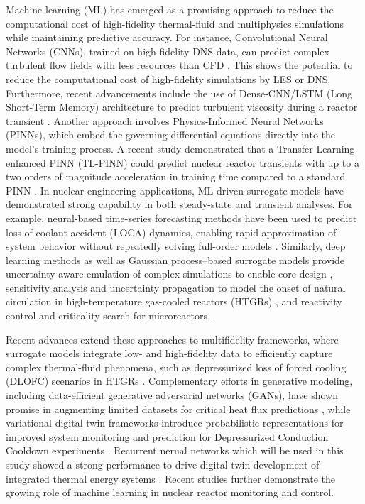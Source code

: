 \documentclass[review]{elsarticle}
\theoremstyle{definition}
\theoremstyle{definition}
\theoremstyle{remark}
\begin{document}
Machine learning (ML) has emerged as a promising approach to reduce the computational cost of high-fidelity thermal-fluid and multiphysics simulations while maintaining predictive accuracy. For instance, {C}onvolutional {N}eural {N}etworks ({CNN}s), trained on high-fidelity {DNS} data, can predict complex turbulent flow fields with less resources than {CFD} \cite{Guo2016, Liu2022111716, Guastoni2021}.  This shows the potential to reduce the computational cost of high-fidelity simulations by {LES} or {DNS}. Furthermore, recent advancements include the use of Dense-{CNN}/{LSTM} ({L}ong {S}hort-{T}erm {M}emory) architecture to predict turbulent viscosity during a reactor transient \cite{Liu2022111716}. Another approach involves {P}hysics-{I}nformed {N}eural {N}etworks ({PINN}s), which embed the governing differential equations directly into the model's training process. A recent study demonstrated that a {T}ransfer {L}earning-enhanced {PINN} ({TL-PINN}) could predict nuclear reactor transients with up to a two orders of magnitude acceleration in training time compared to a standard {PINN} \cite{Konstantinos2023}. In nuclear engineering applications, ML-driven surrogate models have demonstrated strong capability in both steady-state and transient analyses. For example, neural-based time-series forecasting methods have been used to predict loss-of-coolant accident (LOCA) dynamics, enabling rapid approximation of system behavior without repeatedly solving full-order models \cite{radaideh2020neural}. Similarly, deep learning methods \cite{radaideh2019combining,radaideh2020analyzing} as well as Gaussian process–based surrogate models \cite{radaideh2020surrogate} provide uncertainty-aware emulation of complex simulations to enable core design \cite{saleem2020application}, sensitivity analysis and uncertainty propagation to model the onset of natural circulation in high-temperature gas-cooled reactors (HTGRs) \cite{eaheart2025sensitivity}, and reactivity control and criticality search for microreactors \cite{price2022multiobjective,radaideh2026multistep}. 

Recent advances extend these approaches to multifidelity frameworks, where surrogate models integrate low- and high-fidelity data to efficiently capture complex thermal-fluid phenomena, such as depressurized loss of forced cooling (DLOFC) scenarios in HTGRs \cite{eaheart2026multifidelity}. Complementary efforts in generative modeling, including data-efficient generative adversarial networks (GANs), have shown promise in augmenting limited datasets for critical heat flux predictions \cite{nabila2025data}, while variational digital twin frameworks introduce probabilistic representations for improved system monitoring and prediction for Depressurized Conduction Cooldown experiments \cite{burnett2026variational}. Recurrent nerual networks which will be used in this study showed a strong performance to drive digital twin development of integrated thermal energy systems \cite{nabila2026physics}. Recent studies further demonstrate the growing role of machine learning in nuclear reactor monitoring and control. 
\end{document}
